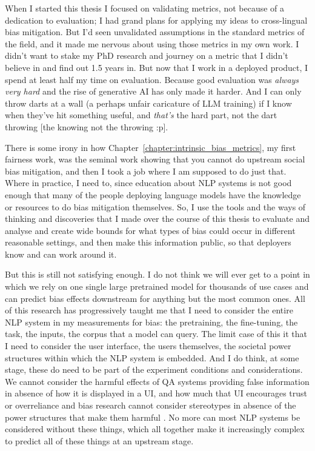 When I started this thesis I focused on validating metrics, not because of a dedication to evaluation; I had grand plans for applying my ideas to cross-lingual bias mitigation. But I'd seen unvalidated assumptions in the standard metrics of the field, and it made me nervous about using those metrics in my own work. I didn't want to stake my PhD research and journey on a metric that I didn't believe in and find out 1.5 years in. But now that I work in a deployed product, I spend at least half my time on evaluation. Because good evaluation was \textit{always very hard} and the rise of generative AI has only made it harder. And I can only throw darts at a wall (a perhaps unfair caricature of LLM training) if I know when they've hit something useful, and \textit{that's} the hard part, not the dart throwing [the knowing not the throwing :p]. 

There is some irony in how Chapter~\ref{chapter:intrinsic_bias_metrics}, my first fairness work, was the seminal work showing that you cannot do upstream social bias mitigation, and then I took a job where I am supposed to do just that. Where in practice, I need to, since education about NLP systems is not good enough that many of the people deploying language models have the knowledge or resources to do bias mitigation themselves. So, I use the tools and the ways of thinking and discoveries that I made over the course of this thesis to evaluate and analyse and create wide bounds for what types of bias could occur in different reasonable settings, and then make this information public, so that deployers know and can work around it. 

But this is still not satisfying enough. I do not think we will ever get to a point in which we rely on one single large pretrained model for thousands of use cases and can predict bias effects downstream for anything but the most common ones. All of this research has progressively taught me that I need to consider the entire NLP system in my measurements for bias: the pretraining, the fine-tuning, the task, the inputs, the corpus that a model can query. The limit case of this it that I need to consider the user interface, the users themselves, the societal power structures within which the NLP system is embedded. And I do think, at some stage, these do need to be part of the experiment conditions and considerations. We cannot consider the harmful effects of QA systems providing false information in absence of how it is displayed in a UI, and how much that UI encourages trust or overreliance \citep{} and bias research cannot consider stereotypes in absence of the power structures that make them harmful \citep{blodgett-etal-2021-stereotyping}. No more can most NLP systems be considered without these things, which all together make it increasingly complex to predict all of these things at an upstream stage. 

